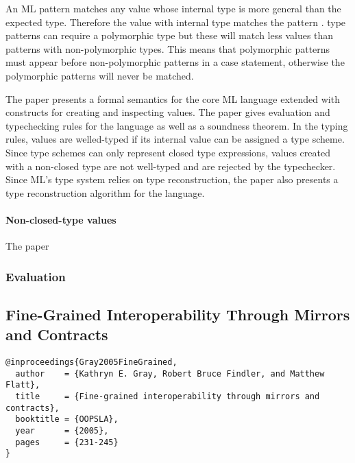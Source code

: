\documentclass[12pt]{article}	%
\begin{document}
An ML \dynamic pattern matches any \Dynamic value whose internal type is more general than the expected type. Therefore the value \dynamic {} with internal type  matches the pattern . \dynamic type patterns can require a polymorphic type but these will match less \Dynamic values than patterns with non-polymorphic types. This means that polymorphic \dynamic patterns must appear before non-polymorphic \dynamic patterns in a case statement, otherwise the polymorphic patterns will never be matched.

The paper presents a formal semantics for the core ML language extended with constructs for creating and inspecting \Dynamic values. The paper gives evaluation and typechecking rules for the language as well as a soundness theorem. In the typing rules, \Dynamic values are welled-typed if its internal value can be assigned a type scheme. Since type schemes can only represent closed type expressions, \Dynamic values created with a non-closed type are not well-typed and are rejected by the typechecker. Since ML's type system relies on type reconstruction, the paper also presents a type reconstruction algorithm for the language.

\paragraph{Non-closed-type \Dynamic values}
The paper


\subsubsection*{Evaluation}




\subsection*{Fine-Grained Interoperability Through Mirrors and Contracts~\cite{Gray2005FineGrained}}

\begin{verbatim}
@inproceedings{Gray2005FineGrained,
  author    = {Kathryn E. Gray, Robert Bruce Findler, and Matthew Flatt},
  title     = {Fine-grained interoperability through mirrors and contracts},
  booktitle = {OOPSLA},
  year      = {2005},
  pages     = {231-245}
}
\end{verbatim}
\end{document}
